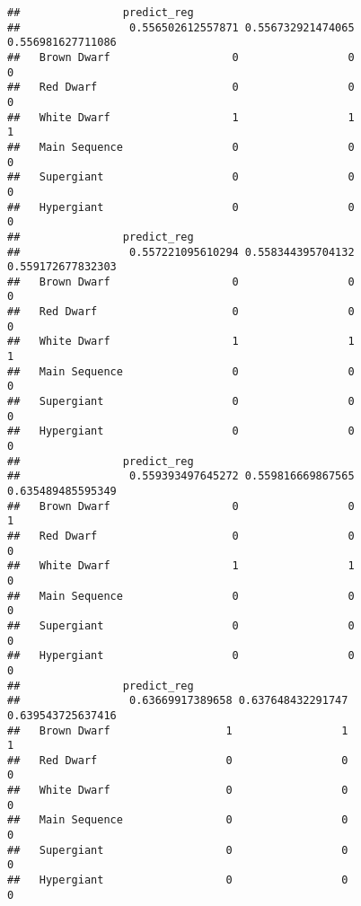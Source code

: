 \documentclass[
]{article}
\newenvironment{Shaded}{\begin{snugshade}}{\end{snugshade}}
\newcommand{\CommentTok}[1]{\textcolor[rgb]{0.50,0.62,0.50}{#1}}
\newcommand{\FunctionTok}[1]{\textcolor[rgb]{0.94,0.94,0.56}{#1}}
\newcommand{\NormalTok}[1]{\textcolor[rgb]{0.80,0.80,0.80}{#1}}
\newcommand{\SpecialCharTok}[1]{\textcolor[rgb]{0.86,0.64,0.64}{#1}}
\begin{document}
\begin{Shaded}
\end{Shaded}

\begin{verbatim}
##                predict_reg
##                 0.556502612557871 0.556732921474065 0.556981627711086
##   Brown Dwarf                   0                 0                 0
##   Red Dwarf                     0                 0                 0
##   White Dwarf                   1                 1                 1
##   Main Sequence                 0                 0                 0
##   Supergiant                    0                 0                 0
##   Hypergiant                    0                 0                 0
##                predict_reg
##                 0.557221095610294 0.558344395704132 0.559172677832303
##   Brown Dwarf                   0                 0                 0
##   Red Dwarf                     0                 0                 0
##   White Dwarf                   1                 1                 1
##   Main Sequence                 0                 0                 0
##   Supergiant                    0                 0                 0
##   Hypergiant                    0                 0                 0
##                predict_reg
##                 0.559393497645272 0.559816669867565 0.635489485595349
##   Brown Dwarf                   0                 0                 1
##   Red Dwarf                     0                 0                 0
##   White Dwarf                   1                 1                 0
##   Main Sequence                 0                 0                 0
##   Supergiant                    0                 0                 0
##   Hypergiant                    0                 0                 0
##                predict_reg
##                 0.63669917389658 0.637648432291747 0.639543725637416
##   Brown Dwarf                  1                 1                 1
##   Red Dwarf                    0                 0                 0
##   White Dwarf                  0                 0                 0
##   Main Sequence                0                 0                 0
##   Supergiant                   0                 0                 0
##   Hypergiant                   0                 0                 0

\end{verbatim}
\end{document}
